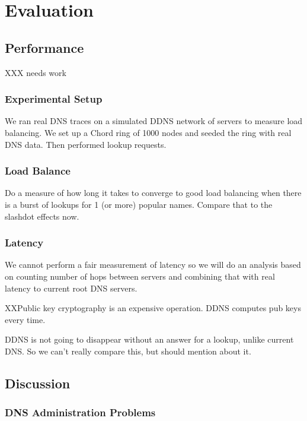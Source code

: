 \section{Evaluation}

\subsection{Performance}

XXX needs work

\subsubsection{Experimental Setup}

We ran real DNS traces on a simulated DDNS network
of servers to measure load balancing. We set up a
Chord ring of 1000 nodes and seeded the ring with 
real DNS data. Then performed lookup requests.

\subsubsection{Load Balance}

Do a measure of how long it takes to converge to good load 
balancing when there is a burst of lookups for 1 (or more)
popular names. Compare that to the slashdot effects now.

\subsubsection{Latency}

We cannot perform a fair measurement of latency so we will do an
analysis based on counting number of hops between servers
and combining that with real latency to current root DNS servers.

XXPublic key cryptography is an expensive operation. 
DDNS computes pub keys every time.

DDNS is not going to disappear without an answer for a lookup,
unlike current DNS. So we can't really compare this, but should
mention about it.

\subsection{Discussion}

\subsubsection{DNS Administration Problems}

